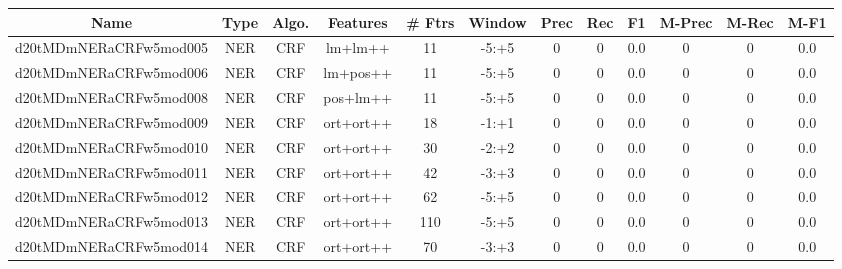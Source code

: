 \documentclass[a4paper]{article}
\begin{document}
\begin{landscape}
\begin{center}
\begin{tabular}{ |c|c|c|c|c|c|c|c|c|c|c|c|} 
 \hline
 	Name & Type & Algo. & Features & \# Ftrs & Window & Prec & Rec & F1 & M-Prec & M-Rec & M-F1\\
 \hline

 	

 
 	
 	\small{ d20tMDmNERaCRFw5mod005 } & \small{ NER} & \small{  CRF }  & lm+lm++  &  11 &  \small{  -5:+5 }  &  0 & 0 & 0.0  &  0 & 0 & 0.0 \\
 	

 
 	
 	\small{ d20tMDmNERaCRFw5mod006 } & \small{ NER} & \small{  CRF }  & lm+pos++  &  11 &  \small{  -5:+5 }  &  0 & 0 & 0.0  &  0 & 0 & 0.0 \\
 	

 
 	
 	\small{ d20tMDmNERaCRFw5mod008 } & \small{ NER} & \small{  CRF }  & pos+lm++  &  11 &  \small{  -5:+5 }  &  0 & 0 & 0.0  &  0 & 0 & 0.0 \\
 	

 
 	
 	\small{ d20tMDmNERaCRFw5mod009 } & \small{ NER} & \small{  CRF }  & ort+ort++  &  18 &  \small{  -1:+1 }  &  0 & 0 & 0.0  &  0 & 0 & 0.0 \\
 	

 
 	
 	\small{ d20tMDmNERaCRFw5mod010 } & \small{ NER} & \small{  CRF }  & ort+ort++  &  30 &  \small{  -2:+2 }  &  0 & 0 & 0.0  &  0 & 0 & 0.0 \\
 	

 
 	
 	\small{ d20tMDmNERaCRFw5mod011 } & \small{ NER} & \small{  CRF }  & ort+ort++  &  42 &  \small{  -3:+3 }  &  0 & 0 & 0.0  &  0 & 0 & 0.0 \\
 	

 
 	
 	\small{ d20tMDmNERaCRFw5mod012 } & \small{ NER} & \small{  CRF }  & ort+ort++  &  62 &  \small{  -5:+5 }  &  0 & 0 & 0.0  &  0 & 0 & 0.0 \\
 	

 
 	
 	\small{ d20tMDmNERaCRFw5mod013 } & \small{ NER} & \small{  CRF }  & ort+ort++  &  110 &  \small{  -5:+5 }  &  0 & 0 & 0.0  &  0 & 0 & 0.0 \\
 	

 
 	
 	\small{ d20tMDmNERaCRFw5mod014 } & \small{ NER} & \small{  CRF }  & ort+ort++  &  70 &  \small{  -3:+3 }  &  0 & 0 & 0.0  &  0 & 0 & 0.0 \\
 	


\end{tabular}
\end{center}
\end{landscape}
\end{document}
